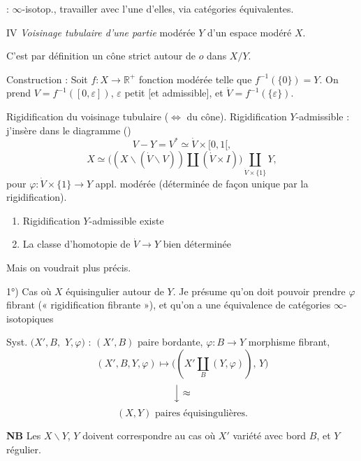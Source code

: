\documentclass[11pt,a4paper]{article}
\begin{document}
\emph{} : \ill{} \ill{} \ill{} \ill{} $\infty$-isotop., \struck{\ill{}} \ill{}  \ill{} travailler avec l'une d'elles, via catégories équivalentes.

IV \emph{Voisinage tubulaire d'une partie} modérée $Y$ d'un espace modéré $X$.

C'est par définition un cône strict \struck{\ill{}}  autour de $o$ dans $X/Y$.

Construction : Soit $f : X \to \mathbb{R}^+$ fonction modérée telle que $f^{-1}(\{0\}) = Y$. On prend $V = f^{-1}([0, \varepsilon])$, $\varepsilon$ petit [et admissible], et $\dot V = f^{-1}(\{\varepsilon\})$.

Rigidification du voisinage tubulaire ($\Leftrightarrow$ du cône). Rigidification $Y$-admissible : j'insère dans le diagramme (\ill{})
\[
  V - Y = V^* \simeq \dot V \times [0, 1[ ,
\]
\[
  X \simeq \bigl( (X \smallsetminus (\dot V \smallsetminus V)) \amalg (\dot V \times I) \bigr) \textstyle\coprod_{\dot V \times \{1\}} Y ,
\]
pour $\varphi : \dot V \times \{1\} \to Y$ appl. modérée (déterminée de façon unique par la rigidification).
\begin{enumerate}
  \item[a)] Rigidification $Y$-admissible existe
  \item[b)] La classe d'homotopie de $\dot V \to Y$ bien déterminée
\end{enumerate}
Mais on voudrait plus précis.



1°) Cas où $X$ équisingulier autour de $Y$. Je présume qu'on doit pouvoir prendre $\varphi$ fibrant (« rigidification fibrante »), et qu'on a une équivalence de catégories $\infty$-isotopiques

Syst. $(X', B,$  $Y, \varphi)$ : $(X', B)$ paire bordante, $\varphi : B \to Y$ morphisme fibrant,
\[
  (X', B, Y, \varphi) \longmapsto \bigl( (X' \textstyle\coprod_B (Y, \varphi)),\, Y \bigr)
\]
\[
  \Big\downarrow \approx
\]
\[
  (X, Y) \text{ paires équisingulières.}
\]

\textbf{NB} Les $X \smallsetminus Y$, $Y$   doivent correspondre au cas où $X'$ variété avec bord $B$, et $Y$ régulier.
\end{document}
